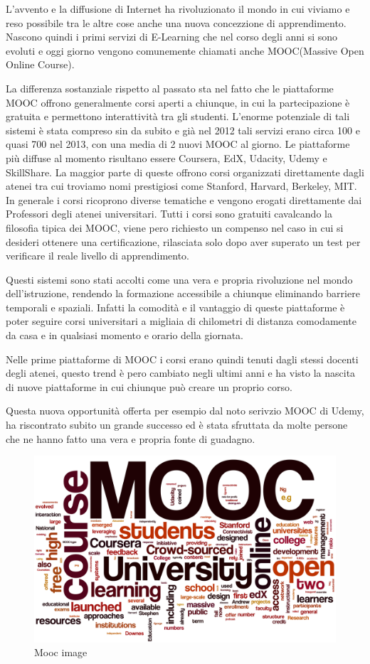 L'avvento e la diffusione di Internet ha rivoluzionato il mondo in cui viviamo e reso possibile tra le altre cose anche una nuova concezzione di apprendimento. Nascono quindi i primi servizi di E-Learning che nel corso degli anni si sono evoluti e oggi giorno vengono comunemente chiamati anche MOOC(Massive Open Online Course).

La differenza sostanziale rispetto al passato sta nel fatto che le piattaforme MOOC offrono generalmente corsi aperti a chiunque, in cui la partecipazione è gratuita e permettono interattività tra gli studenti.
L'enorme potenziale di tali sistemi è stata compreso sin da subito e già nel 2012 tali servizi erano circa 100 e quasi 700 nel 2013, con una media di 2 nuovi MOOC al giorno.
Le piattaforme più diffuse al momento risultano essere Coursera, EdX, Udacity, Udemy e SkillShare.
La maggior parte di queste offrono corsi organizzati direttamente dagli atenei tra cui troviamo nomi prestigiosi come Stanford, Harvard, Berkeley, MIT. In generale i corsi ricoprono diverse tematiche e vengono erogati direttamente dai Professori degli atenei universitari.
Tutti i corsi sono gratuiti cavalcando la filosofia tipica dei MOOC, viene pero richiesto un compenso nel caso in cui si desideri ottenere una certificazione, rilasciata solo dopo aver superato un test per verificare il reale livello di apprendimento.

Questi sistemi sono stati accolti come una vera e propria rivoluzione nel mondo dell'istruzione, rendendo la formazione accessibile a chiunque eliminando barriere temporali e spaziali. Infatti la comodità e il vantaggio di queste piattaforme è poter seguire corsi universitari a migliaia di chilometri di distanza comodamente da casa e in qualsiasi momento e orario della giornata.

Nelle prime piattaforme di MOOC i corsi erano quindi tenuti dagli stessi docenti degli atenei, questo trend è pero cambiato negli ultimi anni e ha visto la nascita di nuove piattaforme in cui chiunque può creare un proprio corso.

Questa nuova opportunità offerta per esempio dal noto serivzio MOOC di Udemy, ha riscontrato subito un grande successo ed è stata sfruttata da molte persone che ne hanno fatto una vera e propria fonte di guadagno. 


\begin{figure}[htb] %
 \centering
 \includegraphics[width=0.8\linewidth]{images/introduction/mooc.png}\hfill
 \caption[Mooc image]{Mooc image}
 \label{fig:fourV}
\end{figure}

